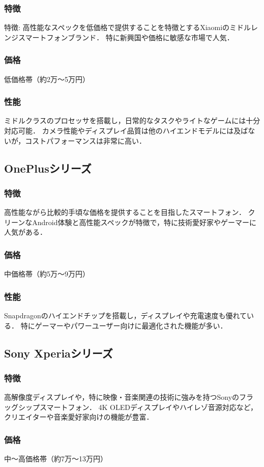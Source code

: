 \documentclass[titlepage,a4paper]{jsarticle}
\begin{document}
\subsubsection{特徴}
特徴: 高性能なスペックを低価格で提供することを特徴とするXiaomiのミドルレンジスマートフォンブランド．
特に新興国や価格に敏感な市場で人気．
\subsubsection{価格}
低価格帯（約2万～5万円）
\subsubsection{性能}
ミドルクラスのプロセッサを搭載し，日常的なタスクやライトなゲームには十分対応可能．
カメラ性能やディスプレイ品質は他のハイエンドモデルには及ばないが，コストパフォーマンスは非常に高い．
\subsection{OnePlusシリーズ}
\subsubsection{特徴}
高性能ながら比較的手頃な価格を提供することを目指したスマートフォン．
クリーンなAndroid体験と高性能スペックが特徴で，特に技術愛好家やゲーマーに人気がある．
\subsubsection{価格}
中価格帯（約5万～9万円）
\subsubsection{性能}
Snapdragonのハイエンドチップを搭載し，ディスプレイや充電速度も優れている．
特にゲーマーやパワーユーザー向けに最適化された機能が多い．
\subsection{Sony Xperiaシリーズ}
\subsubsection{特徴}
高解像度ディスプレイや，特に映像・音楽関連の技術に強みを持つSonyのフラッグシップスマートフォン．
4K OLEDディスプレイやハイレゾ音源対応など，クリエイターや音楽愛好家向けの機能が豊富．
\subsubsection{価格}
中～高価格帯（約7万～13万円）
\end{document}
